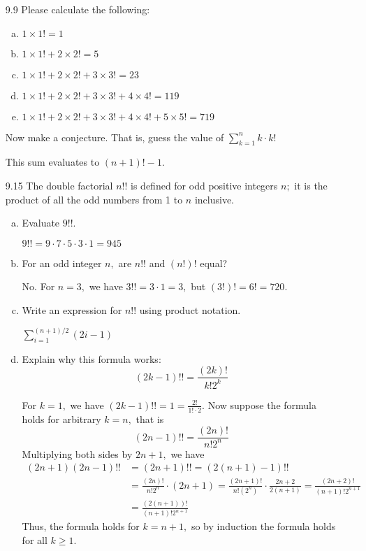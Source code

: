 \documentclass{article}
\begin{document}
\begin{enumerate}
	\item[9.9] Please calculate the following:
		\begin{enumerate}[a.]
			\item $1\times 1!=1$

			\item $1\times 1!+2\times 2!=5$

			\item $1\times 1!+2\times2!+3\times3!=23$

			\item $1\times1!+2\times2!+3\times3!+4\times4!=119$

			\item $1\times1!+2\times2!+3\times3!+4\times4!+5\times5! = 719$
		
		\end{enumerate}
		Now make a conjecture. That is, guess the value of $\displaystyle\sum_{k=1}^{n} k\cdot k!$
		\begin{answer*}
			This sum evaluates to $(n+1)!-1.$
		\end{answer*}

	\item[9.15] The double factorial $n!!$ is defined for odd positive integers $n;$ it is the product of all the odd numbers from 1 to $n$ inclusive.
		\begin{enumerate}[a.]
			\item Evaluate $9!!.$
				\begin{answer*}
					$9!!=9\cdot7\cdot5\cdot3\cdot1=945$
				\end{answer*}

			\item For an odd integer $n,$ are $n!!$ and $(n!)!$ equal?
				\begin{answer*}
					No. For $n=3,$ we have $3!!=3\cdot1=3,$ but $(3!)!=6!=720.$
				\end{answer*}

			\item Write an expression for $n!!$ using product notation.
				\begin{answer*}
					$\displaystyle\sum_{i=1}^{(n+1)/2}(2i-1)$
				\end{answer*}

			\item Explain why this formula works:
				\[(2k-1)!!=\frac{(2k)!}{k!2^k}\]
				\begin{soln}
					For $k=1,$ we have $(2k-1)!!=1=\frac{2!}{1!\cdot2}.$ Now suppose the formula holds for arbitrary $k=n,$ that is
					\[(2n-1)!!=\frac{(2n)!}{n!2^n}\]
					Multiplying both sides by $2n+1,$ we have
					\begin{align*}
						(2n+1)(2n-1)!! &= (2n+1)!! = (2(n+1)-1)!! \\
						&= \frac{(2n)!}{n!2^n} \cdot(2n+1) = \frac{(2n+1)!}{n!(2^n)}\cdot\frac{2n+2}{2(n+1)} = \frac{(2n+2)!}{(n+1)!2^{n+1}} \\
						&= \frac{(2(n+1))!}{(n+1)!2^{n+1}}
					\end{align*}
					Thus, the formula holds for $k=n+1,$ so by induction the formula holds for all $k\ge 1.$
				\end{soln}
				

\end{enumerate}
\end{enumerate}
\end{document}
